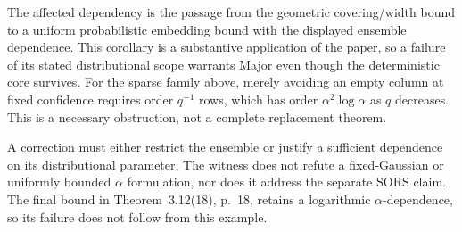 \documentclass[10pt]{article}
\begin{document}
The affected dependency is the passage from the geometric covering/width bound to a uniform probabilistic embedding bound with the displayed ensemble dependence. This corollary is a substantive application of the paper, so a failure of its stated distributional scope warrants Major even though the deterministic core survives. For the sparse family above, merely avoiding an empty column at fixed confidence requires order \(q^{-1}\) rows, which has order \(\alpha^2\log\alpha\) as \(q\) decreases. This is a necessary obstruction, not a complete replacement theorem.\par
A correction must either restrict the ensemble or justify a sufficient dependence on its distributional parameter. The witness does not refute a fixed-Gaussian or uniformly bounded \(\alpha\) formulation, nor does it address the separate SORS claim. The final bound in Theorem 3.12(18), p. 18, retains a logarithmic \(\alpha\)-dependence, so its failure does not follow from this example.\par
\end{document}
